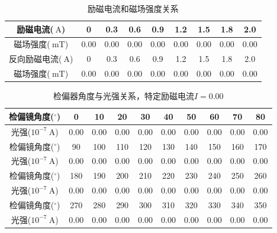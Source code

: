 \documentclass{ctexart}
\newcommand{\si}[1]{\  \mathrm{#1}}
\begin{document}
    \begin{table}[H]
      \centering
      \begin{tabular}{|c|c|c|c|c|c|c|c|c|}
        \hline
        励磁电流($\si{A}$) & 0 & 0.3 & 0.6 & 0.9 & 1.2 & 1.5 & 1.8 & 2.0 \\\hline
        磁场强度($\si{mT}$) & 0.00 & 0.00 & 0.00 & 0.00 & 0.00 & 0.00 & 0.00 & 0.00 \\\hline
        反向励磁电流($\si{A}$) & 0 & 0.3 & 0.6 & 0.9 & 1.2 & 1.5 & 1.8 & 2.0 \\\hline
        磁场强度($\si{mT}$) & 0.00 & 0.00 & 0.00 & 0.00 & 0.00 & 0.00 & 0.00 & 0.00  \\\hline
      \end{tabular}
      \caption{励磁电流和磁场强度关系}
    \end{table}
    \begin{table}[H]
      \centering
      \begin{tabular}{|c|c|c|c|c|c|c|c|c|c|}
        \hline
        检偏镜角度(${}^{\circ}$) & 0 & 10 & 20 & 30 & 40 & 50 & 60 & 70 & 80 \\\hline
        光强($10^{-7} \si{A}$)  & 0.00 & 0.00 & 0.00 & 0.00 & 0.00 & 0.00 & 0.00 & 0.00 & 0.00 \\\hline
        检偏镜角度(${}^{\circ}$) & 90 & 100 & 110 & 120 & 130 & 140 & 150 & 160 & 170 \\\hline
        光强($10^{-7} \si{A}$)  & 0.00 & 0.00 & 0.00 & 0.00 & 0.00 & 0.00 & 0.00 & 0.00 & 0.00  \\\hline
        检偏镜角度(${}^{\circ}$) & 180 & 190 & 200 & 210 & 220 & 230 & 240 & 250 & 260  \\\hline
        光强($10^{-7} \si{A}$)  & 0.00 & 0.00 & 0.00 & 0.00 & 0.00 & 0.00 & 0.00 & 0.00 & 0.00 \\\hline
        检偏镜角度(${}^{\circ}$) & 270 & 280 & 290 & 300 & 310 & 320 & 330 & 340 & 350 \\\hline
        光强($10^{-7} \si{A}$)  & 0.00 & 0.00 & 0.00 & 0.00 & 0.00 & 0.00 & 0.00 & 0.00 & 0.00 \\\hline
      \end{tabular}
      \caption{检偏器角度与光强关系，特定励磁电流$I=0.00$}
    \end{table}
\end{document}
